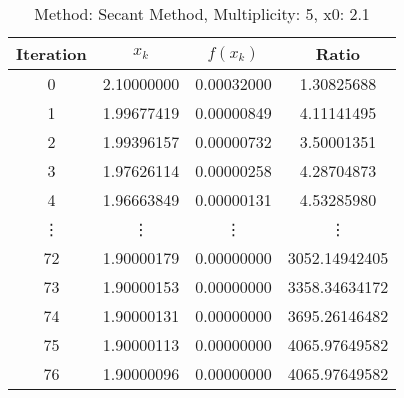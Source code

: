 \begin{table}
\centering
\caption{Method: Secant Method, Multiplicity: 5, x0: 2.1}
\label{tab:table_Secant_Method_5_2_1}
\begin{tabular}{c c c c}
\toprule
Iteration &      $x_k$ &   $f(x_k)$ &         Ratio \\
\midrule
        0 & 2.10000000 & 0.00032000 &    1.30825688 \\
        1 & 1.99677419 & 0.00000849 &    4.11141495 \\
        2 & 1.99396157 & 0.00000732 &    3.50001351 \\
        3 & 1.97626114 & 0.00000258 &    4.28704873 \\
        4 & 1.96663849 & 0.00000131 &    4.53285980 \\
   \vdots &     \vdots &     \vdots &        \vdots \\
       72 & 1.90000179 & 0.00000000 & 3052.14942405 \\
       73 & 1.90000153 & 0.00000000 & 3358.34634172 \\
       74 & 1.90000131 & 0.00000000 & 3695.26146482 \\
       75 & 1.90000113 & 0.00000000 & 4065.97649582 \\
       76 & 1.90000096 & 0.00000000 & 4065.97649582 \\
\bottomrule
\end{tabular}
\end{table}
